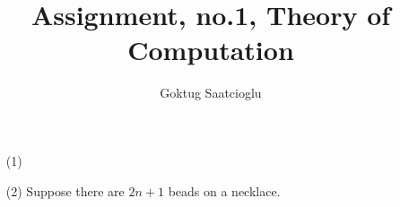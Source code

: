 \documentclass [10pt]{article}
\begin{document}
\title{Assignment, no.1, Theory of Computation}
\author{Goktug Saatcioglu}
\maketitle
\begin{enumerate}
	\item[(1)]
	\item[(2)]Suppose there are $2n+1$ beads on a necklace. 
\end{enumerate}
\end{document}
